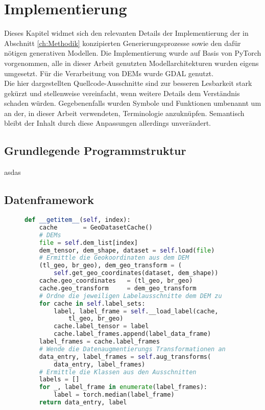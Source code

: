 \chapter{Implementierung}
\label{ch:Implementierung}

Dieses Kapitel widmet sich den relevanten Details der Implementierung der in Abschnitt \ref{ch:Methodik} konzipierten Generierungsprozesse sowie den dafür nötigen generativen Modellen. Die Implementierung wurde auf Basis von PyTorch vorgenommen, alle in dieser Arbeit genutzten Modellarchitekturen wurden eigens umgesetzt. Für die Verarbeitung von DEMs wurde GDAL genutzt.\\
Die hier dargestellten Quellcode-Ausschnitte sind zur besseren Lesbarkeit stark gekürzt und stellenweise vereinfacht, wenn weitere Details dem Verständnis schaden würden. Gegebenenfalls wurden Symbole und Funktionen umbenannt um an der, in dieser Arbeit verwendeten, Terminologie anzuknüpfen. Semantisch bleibt der Inhalt durch diese Anpassungen allerdings unverändert.

\section {Grundlegende Programmstruktur}

asdas


\section {Datenframework}
\begin{figure}[htbp]
\begin{lstlisting}[language=python]
def __getitem__(self, index):
    cache       = GeoDatasetCache()
    # DEMs
    file = self.dem_list[index]
    dem_tensor, dem_shape, dataset = self.load(file)  
    # Ermittle die Geokoordinaten aus dem DEM
    (tl_geo, br_geo), dem_geo_transform = (
        self.get_geo_coordinates(dataset, dem_shape))    
    cache.geo_coordinates   = (tl_geo, br_geo)
    cache.geo_transform     = dem_geo_transform
    # Ordne die jeweiligen Labelausschnitte dem DEM zu 
    for cache in self.label_sets:
        label, label_frame = self.__load_label(cache, 
            tl_geo, br_geo)
        cache.label_tensor = label
        cache.label_frames.append(label_data_frame)
    label_frames = cache.label_frames
    # Wende die Datenaugmentierungs Transformationen an 
    data_entry, label_frames = self.aug_transforms(
        data_entry, label_frames)
    # Ermittle die Klassen aus den Ausschnitten 
    labels = []
    for _, label_frame in enumerate(label_frames):
        label = torch.median(label_frame)
    return data_entry, label
\end{lstlisting}
    \captionsetup{type=figure}
    \label{fig:Data_runtime}
\end{figure}


